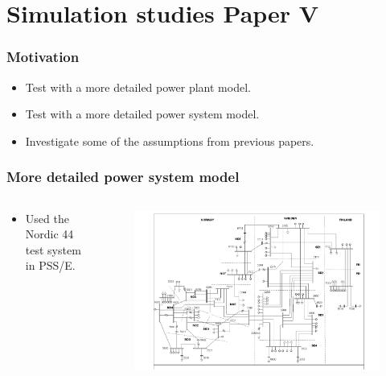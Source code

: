 \section{Simulation studies Paper V}
\begin{frame}
	\frametitle{Motivation}
	\begin{itemize}
		\item Test with a more detailed power plant model.
		\item Test with a more detailed power system model.
		\item Investigate some of the assumptions from previous papers.
	\end{itemize}
\end{frame}
\begin{frame}
	\frametitle{More detailed power system model}
	\begin{columns}
		\begin{column}{0.5\textwidth}
			\begin{itemize}
				\item Used the Nordic 44 test system in PSS/E.
			\end{itemize}
		\end{column}
		\begin{column}{0.5\textwidth}
			\begin{figure}
				\includegraphics[width=\textwidth]{./pictures/Nordic44-Bilde}
			\end{figure}
		\end{column}
	\end{columns}
\end{frame}
